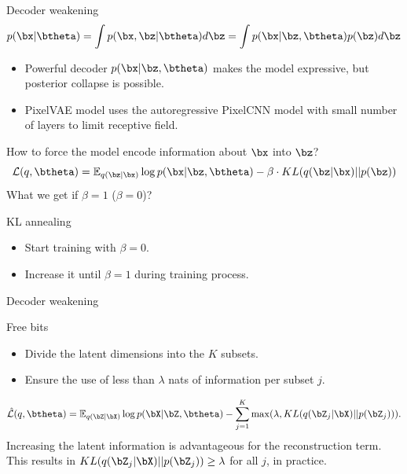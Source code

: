 \begin{frame}{Decoder weakening}
	\[
		p(\bx | \btheta) = \int p(\bx, \bz | \btheta) d \bz = \int p(\bx | \bz, \btheta) p(\bz) d \bz 
	\]
	\begin{itemize}
		\item Powerful decoder $p(\bx | \bz, \btheta)$ makes the model expressive, but posterior collapse is possible.
		\item PixelVAE model uses the autoregressive PixelCNN model with small number of layers to limit receptive field.
	\end{itemize}
	How to force the model encode information about $\bx$ into $\bz$?
	\[
	    \mathcal{L}(q, \btheta) = \mathbb{E}_{q(\bz | \bx)} \log p(\bx | \bz, \btheta) - \beta \cdot KL (q(\bz | \bx) || p(\bz))
	\]
	What we get if $\beta = 1$ ($\beta = 0$)? \\
	
	\begin{block}{KL annealing}
		\begin{itemize}
		    \item Start training with $\beta = 0$.
		    \item Increase it until $\beta = 1$ during training process.
		\end{itemize}
	\end{block}
\end{frame}
\begin{frame}{Decoder weakening}
	\begin{block}{Free bits}
	\begin{itemize}
	\item Divide the latent dimensions into the $K$ subsets.
	\item Ensure the use of less than $\lambda$ nats of information per subset $j$.
	\end{itemize}
	\[
	    \hat{\mathcal{L}}(q, \btheta) = \mathbb{E}_{q(\bZ | \bX)} \log p(\bX | \bZ, \btheta) - \sum_{j=1}^K \max(\lambda, KL (q(\bZ_j | \bX) || p(\bZ_j))).
	\]
	Increasing the latent information is advantageous for the reconstruction term. \\
	\vspace{0.2cm}
	This results in $KL (q(\bZ_j | \bX) || p(\bZ_j)) \geq \lambda$ for all $j$, in practice.
	\end{block}
\end{frame}
